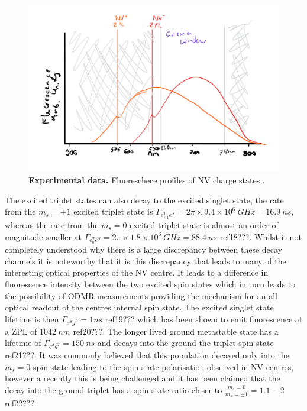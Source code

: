 \documentclass[preprint,prl]{revtex4}
\begin{document}
\begin{figure}[t]
  \centering
  \includegraphics[width=1\textwidth]{Fluoro.png} 
 \caption{\textbf{Experimental data.} Fluoreschece profiles of NV charge states .} \label{FigFluoro}
\end{figure}

The excited triplet states can also decay to the excited singlet state, the rate from the $m_s=\pm1$ excited triplet state is $\Gamma_{e^T_{\pm1}e^S} = 2\pi\times9.4\times10^6\SI{}{GHz} = \SI{16.9}{ns}$, whereas the rate from the $m_s=0$ excited triplet state is almost an order of magnitude smaller at $\Gamma_{e^T_{0}e^S} = 2\pi\times1.8\times10^6 \SI{}{GHz} = \SI{88.4}{ns}$ ref18???. Whilst it not completely understood why there is a large discrepancy between these decay channels it is noteworthy that it is this discrepancy that leads to many of the interesting optical properties of the NV centre. It leads to a difference in fluorescence intensity between the two excited spin states which in turn leads to the possibility of ODMR measurements providing the mechanism for an all optical readout of the centres internal spin state. The excited singlet state lifetime is then $\Gamma_{e^Sg^S} = \si{1}{ns}$ ref19??? which has been shown to emit fluorescence at a ZPL of $\SI{1042}{nm}$ ref20???. The longer lived ground metastable state has a lifetime of $\Gamma_{g^Sg^T} = \SI{150}{ns}$ and decays into the ground the triplet spin state ref21???. It was commonly believed that this population decayed only into the $m_s=0$ spin state leading to the spin state polarisation observed in NV centres, however a recently this is being challenged and it has been claimed that the decay into the ground triplet has a spin state ratio closer to $\frac{m_s=0}{m_s=\pm1} = 1.1-2$ ref22???. 
\end{document}
